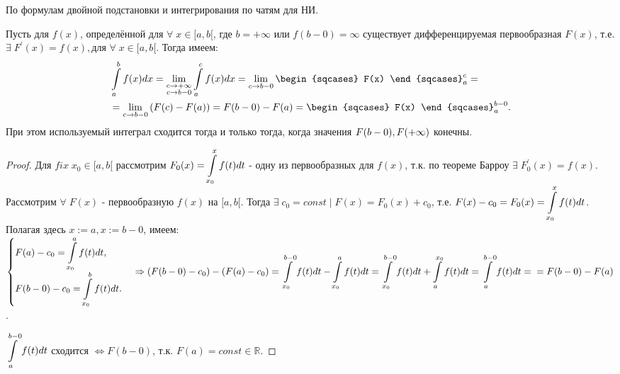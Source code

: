 \begin{plan}
\item По формулам двойной подстановки и интегрирования по чатям для НИ.
\end{plan}
\begin{theorem}
Пусть для $f(x)$, определённой для $\forall \; x \in [a, b[$, где $b = + \infty$ или $f(b - 0) = \infty$ существует дифференцируемая первообразная $F(x)$, т.е. $\exists \; F^{'}(x) = f(x), \text{для }\forall \; x \in [a, b[$. Тогда имеем:
\begin{equation*}
\begin{split}
&\dint\limits_{a}^{b} f(x)dx = \lim\limitslimits{c \to + \infty}{c \to b-0} \dint\limits_{a}^{c} f(x)dx = \lim\limits_{c\to b-0} \begin{sqcases} F(x) \end{sqcases}^{c}_{a} = \\
& =\lim\limits_{c\to b-0} \left(F(c) - F(a)\right) = F(b-0) - F(a) = \begin{sqcases} F(x) \end{sqcases}^{b-0}_{a}.
\end{split}
\end{equation*}
При этом используемый интеграл сходится тогда и только тогда, когда значения $\linebreak F(b-0), F(+\infty)$ конечны.
\end{theorem}
\begin{proof}
	Для $fix \; x_0 \in [a,b[$ рассмотрим $F_0(x) = \displaystyle\int\limits_{x_0}^	{x}f(t)dt$ - одну из первообразных для $f(x)$, т.к. по теореме Барроу $\exists \; F_0^{'}(x) = f(x)$. Рассмотрим $\forall \; F(x)$ - первообразную $f(x)$ на $[a,b[$. Тогда $\exists \; c_0 = const \; | \; F(x) = F_0(x) + c_0$, т.е. $F(x) - c_0 = F_0(x) = \displaystyle\int\limits_{x_0}^{x}f(t)dt$. Полагая здесь $x := a, x := b-0$, имеем: \newline $\begin{cases}F(a) - c_0 = \dintl_{x_0}^{a} f(t)dt, \\ F(b-0) - c_0 = \dintl_{x_0}^{b} f(t)dt. \end{cases} \Rightarrow \left(F(b-0) - c_0\right) - \left(F(a) - c_0\right) = \dintl_{x_0}^{b-0} f(t)dt - \dintl_{x_0}^{a} f(t)dt = \dintl_{x_0}^{b-0} f(t)dt + \dintl_{a}^{x_0} f(t)dt = \dintl_{a}^{b-0} f(t)dt = \newline = F(b-0) - F(a)$.

	$\displaystyle\int\limits_{a}^{b-0} f(t)dt$ сходится $\Leftrightarrow F(b-0)$, т.к. $F(a) = const \in \mathbb{R}$.
\end{proof}
